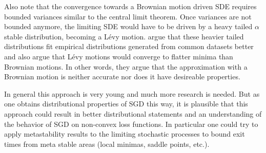 Also note that the convergence towards a Brownian motion driven SDE requires
bounded variances similar to the central limit theorem. Once variances are not
bounded anymore, the limiting SDE would have to be driven by a heavy tailed
\(\alpha\) stable distribution, becoming a Lévy motion. \textcite{simsekliTailIndexAnalysisStochastic2019}
argue that these heavier tailed distributions fit empirical distributions
generated from common datasets better and also argue that Lévy motions would
converge to flatter minima than Brownian motions. In other words, they argue
that the approximation with a Brownian motion is neither accurate nor does it
have desireable properties.

In general this approach is very young and much more research is needed. But as
one obtains distributional properties of SGD this way, it is plausible that
this approach could result in better distributional statements and an
understanding of the behavior of SGD on non-convex loss functions. In particular
one could try to apply metastability results
\parencite[e.g.][]{bovierMetastabilityPotentialTheoreticApproach2015} to the
limiting stochastic processes to bound exit times from meta stable areas (local
minimas, saddle points, etc.).


\endinput
